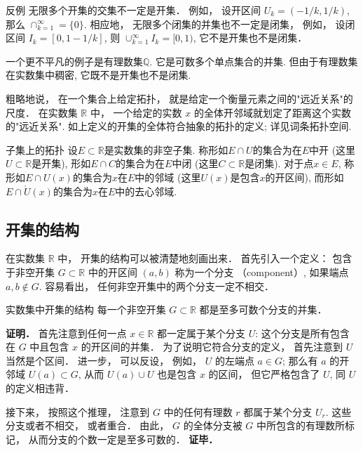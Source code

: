 \begin{example}{反例}
无限多个开集的交集不一定是开集． 例如， 设开区间 $U_k=(-1/k,1/k)$, 那么 $\cap_{k=1}^\infty=\{0\}$. 相应地， 无限多个闭集的并集也不一定是闭集， 例如， 设闭区间 $I_k=[0,1-1/k]$, 则 $\cup_{k=1}^\infty I_k=[0,1)$, 它不是开集也不是闭集．

一个更不平凡的例子是有理数集$\mathbb{Q}$. 它是可数多个单点集合的并集. 但由于有理数集在实数集中稠密, 它既不是开集也不是闭集.
\end{example}

粗略地说， 在一个集合上给定拓扑， 就是给定一个衡量元素之间的"远近关系"的尺度． 在实数集 $\mathbb{R}$ 中， 一个给定的实数 $x$ 的全体开邻域就划定了距离这个实数的"远近关系". 如上定义的开集的全体符合抽象的拓扑的定义; 详见词条拓扑空间.

\begin{definition}{子集上的拓扑}
设$E\subset\mathbb{R}$是实数集的非空子集. 称形如$E\cap U$的集合为在$E$中开 (这里$U\subset\mathbb{R}$是开集), 形如$E\cap C$的集合为在$E$中闭 (这里$C\subset\mathbb{R}$是闭集). 对于点$x\in E$, 称形如$E\cap U(x)$的集合为$x$在$E$中的邻域 (这里$U(x)$是包含$x$的开区间), 而形如$E\cap \mathring U(x)$的集合为$x$在$E$中的去心邻域.
\end{definition}

\subsection{开集的结构}
在实数集 $\mathbb{R}$ 中， 开集的结构可以被清楚地刻画出来． 首先引入一个定义： 包含于非空开集 $G\subset\mathbb{R}$ 中的开区间 $(a,b)$ 称为一个分支 （component）, 如果端点 $a,b\notin G$. 容易看出， 任何非空开集中的两个分支一定不相交．

\begin{theorem}{实数集中开集的结构}
每一个非空开集 $G\subset\mathbb{R}$ 都是至多可数个分支的并集． 
\end{theorem}
\textbf{证明．} 首先注意到任何一点 $x\in\mathbb{R}$ 都一定属于某个分支 $U$: 这个分支是所有包含在 $G$ 中且包含 $x$ 的开区间的并集． 为了说明它符合分支的定义， 首先注意到 $U$ 当然是个区间． 进一步， 可以反设， 例如， $U$ 的左端点 $a\in G$; 那么有 $a$ 的开邻域 $U(a)\subset G$, 从而 $U(a)\cup U$ 也是包含 $x$ 的区间， 但它严格包含了 $U$, 同 $U$ 的定义相违背．

接下来， 按照这个推理， 注意到 $G$ 中的任何有理数 $r$ 都属于某个分支 $U_r$. 这些分支或者不相交， 或者重合． 由此， $G$ 的全体分支被 $G$ 中所包含的有理数所标记， 从而分支的个数一定是至多可数的． \textbf{证毕．}

